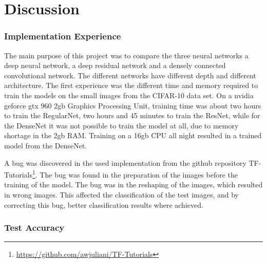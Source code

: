 \chapter{Discussion}
\label{chp:discussion}

\subsection{Implementation Experience}

The main purpose of this project was to compare the three neural networks a deep neural network, a deep residual network and a densely connected convolutional network. The different networks have different depth and different architecture. The first experience was the different time and memory required to train the models on the small images from the CIFAR-10 data set. On a nvidia geforce gtx 960 2gb Graphics Processing Unit, training time was about two hours to train the RegularNet, two hours and 45 minutes to train the ResNet, while for the DenseNet it was not possible to train the model at all, due to memory shortage in the 2gb RAM. Training on a 16gb CPU all night resulted in a trained model from the DenseNet.

A bug was discovered in the used implementation from the github repository TF-Tutorials\footnote{\url{https://github.com/awjuliani/TF-Tutorials}}. The bug was found in the preparation of the images before the training of the model. The bug was in the reshaping of the images, which resulted in wrong images. This affected the classification of the test images, and by correcting this bug, better classification results where achieved.
\newpage
\subsection{Test Accuracy}

\FloatBarrier

